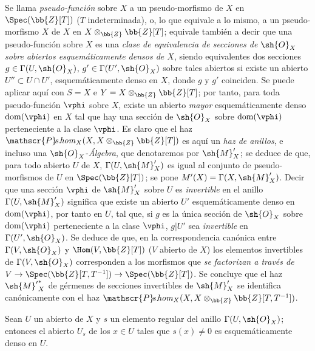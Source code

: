 \begin{env}[20.2.8]
\label{IV.20.2.8}
Se llama \emph{pseudo-función} sobre $X$ a un pseudo-morfismo de $X$ en $\Spec(\bb{Z}[T])$ ($T$ indeterminada), o, lo que equivale a lo mismo, a un pseudo-morfismo $X$ de $X$ en $X\otimes_{\bb{Z}}\bb{Z}[T]$; equivale también  a decir que una pseudo-función sobre $X$ es una \emph{clase de equivalencia de secciones de $\sh{O}_X$ sobre abiertos esquemáticamente densos de $X$}, siendo equivalentes dos secciones $g\in\Gamma(U,\sh{O}_X)$, $g'\in\Gamma(U',\sh{O}_X)$ sobre tales abiertos si existe un abierto $U''\subset U\cap U'$, esquemáticamente denso en $X$, donde $g$ y $g'$ coinciden.
Se puede aplicar aquí  con $S=X$ e $Y=X\otimes_{\bb{Z}}\bb{Z}[T]$; por tanto, para toda pseudo-función $\vphi$ sobre $X$, existe un abierto \emph{mayor} esquemáticamente denso $\operatorname{dom}(\vphi)$ en $X$ tal que hay una sección de $\sh{O}_X$ sobre $\operatorname{dom}(\vphi)$ perteneciente a la clase $\vphi$.
Es claro que el haz $\mathscr{P}\!s.\!\mathit{hom}_X(X,X\otimes_{\bb{Z}}\bb{Z}[T])$ es aquí un \emph{haz de anillos}, e incluso una $\sh{O}_X$-\emph{Álgebra}, que denotaremos por $\sh{M}'_X$; se deduce de  que, para todo abierto $U$ de $X$, $\Gamma(U,\sh{M}'_X)$ es igual al conjunto de pseudo-morfismos de $U$ en $\Spec(\bb{Z}[T])$; se pone $M'(X)=\Gamma(X,\sh{M}'_X)$.
Decir que una sección $\vphi$ de $\sh{M}'_X$ sobre $U$ es \emph{invertible} en el anillo $\Gamma(U,\sh{M}'_X)$ significa que existe un abierto $U'$ esquemáticamente denso en $\operatorname{dom}(\vphi)$, por tanto en $U$, tal que, si $g$ es la única sección de $\sh{O}_X$ sobre $\operatorname{dom}(\vphi)$ perteneciente a la clase $\vphi$, $g|U'$ sea \emph{invertible} en $\Gamma(U',\sh{O}_X)$.
Se deduce de  que, en la correspondencia canónica entre $\Gamma(V,\sh{O}_X)$ y $\Hom(V,\bb{Z}[T])$ ($V$ abierto de $X$) los elementos invertibles de $\Gamma(V,\sh{O}_X)$ corresponden a los morfismos que \emph{se}
\emph{factorizan a través de} $V\to\Spec(\bb{Z}[T,T^{-1}])\to\Spec(\bb{Z}[T])$.
Se concluye que el haz ${\sh{M}'}^*_X$ de gérmenes de secciones invertibles de $\sh{M}'_X$ se identifica canónicamente con el haz $\mathscr{P}\!s.\!\mathit{hom}_X(X,X\otimes_{\bb{Z}}\bb{Z}[T,T^{-1}])$.
\end{env}

\begin{lemma}[20.2.9]
\label{IV.20.2.9}
Sean $U$ un abierto de $X$ y $s$ un elemento regular del anillo $\Gamma(U,\sh{O}_X)$; entonces el abierto $U_s$ de los $x\in U$ tales que $s(x)\neq0$ es esquemáticamente denso en $U$.
\end{lemma}

